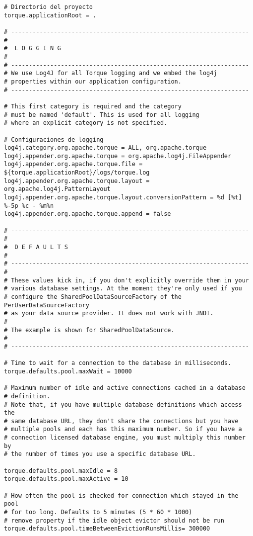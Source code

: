 \begin{lstlisting}
# Directorio del proyecto
torque.applicationRoot = .

# -------------------------------------------------------------------
#
#  L O G G I N G
#
# -------------------------------------------------------------------
# We use Log4J for all Torque logging and we embed the log4j
# properties within our application configuration.
# -------------------------------------------------------------------

# This first category is required and the category
# must be named 'default'. This is used for all logging
# where an explicit category is not specified.

# Configuraciones de logging
log4j.category.org.apache.torque = ALL, org.apache.torque
log4j.appender.org.apache.torque = org.apache.log4j.FileAppender
log4j.appender.org.apache.torque.file = ${torque.applicationRoot}/logs/torque.log
log4j.appender.org.apache.torque.layout = org.apache.log4j.PatternLayout
log4j.appender.org.apache.torque.layout.conversionPattern = %d [%t] %-5p %c - %m%n
log4j.appender.org.apache.torque.append = false

# -------------------------------------------------------------------
#
#  D E F A U L T S
#
# -------------------------------------------------------------------
#
# These values kick in, if you don't explicitly override them in your
# various database settings. At the moment they're only used if you
# configure the SharedPoolDataSourceFactory of the PerUserDataSourceFactory
# as your data source provider. It does not work with JNDI.
#
# The example is shown for SharedPoolDataSource.
#
# -------------------------------------------------------------------

# Time to wait for a connection to the database in milliseconds.
torque.defaults.pool.maxWait = 10000

# Maximum number of idle and active connections cached in a database
# definition.
# Note that, if you have multiple database definitions which access the
# same database URL, they don't share the connections but you have
# multiple pools and each has this maximum number. So if you have a
# connection licensed database engine, you must multiply this number by
# the number of times you use a specific database URL.

torque.defaults.pool.maxIdle = 8
torque.defaults.pool.maxActive = 10

# How often the pool is checked for connection which stayed in the pool
# for too long. Defaults to 5 minutes (5 * 60 * 1000)
# remove property if the idle object evictor should not be run
torque.defaults.pool.timeBetweenEvictionRunsMillis= 300000


\end{lstlisting}
